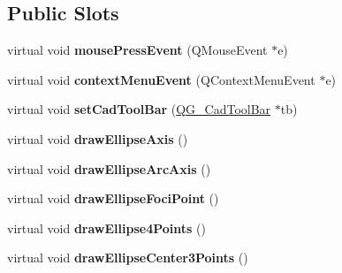 \subsection*{Public Slots}
\begin{DoxyCompactItemize}
\item 
\hypertarget{classQG__CadToolBarEllipses_aefb17f181cb3f1577c521fddf9ce9aeb}{virtual void {\bfseries mouse\-Press\-Event} (Q\-Mouse\-Event $\ast$e)}\label{classQG__CadToolBarEllipses_aefb17f181cb3f1577c521fddf9ce9aeb}

\item 
\hypertarget{classQG__CadToolBarEllipses_ad0e59b807b9b0c251b7962d2c3dcbccd}{virtual void {\bfseries context\-Menu\-Event} (Q\-Context\-Menu\-Event $\ast$e)}\label{classQG__CadToolBarEllipses_ad0e59b807b9b0c251b7962d2c3dcbccd}

\item 
\hypertarget{classQG__CadToolBarEllipses_a1c755426c34469f959b4b71fb3ef77b4}{virtual void {\bfseries set\-Cad\-Tool\-Bar} (\hyperlink{classQG__CadToolBar}{Q\-G\-\_\-\-Cad\-Tool\-Bar} $\ast$tb)}\label{classQG__CadToolBarEllipses_a1c755426c34469f959b4b71fb3ef77b4}

\item 
\hypertarget{classQG__CadToolBarEllipses_a366352b70bdd9b97a832e2b4c05e6328}{virtual void {\bfseries draw\-Ellipse\-Axis} ()}\label{classQG__CadToolBarEllipses_a366352b70bdd9b97a832e2b4c05e6328}

\item 
\hypertarget{classQG__CadToolBarEllipses_a41c7f083f56bcf4b83f97bf8c2c3b7d7}{virtual void {\bfseries draw\-Ellipse\-Arc\-Axis} ()}\label{classQG__CadToolBarEllipses_a41c7f083f56bcf4b83f97bf8c2c3b7d7}

\item 
\hypertarget{classQG__CadToolBarEllipses_a771a0149b6c2f7b943d02069bf4b93ed}{virtual void {\bfseries draw\-Ellipse\-Foci\-Point} ()}\label{classQG__CadToolBarEllipses_a771a0149b6c2f7b943d02069bf4b93ed}

\item 
\hypertarget{classQG__CadToolBarEllipses_a5955779ea145ac256da278544bd968a5}{virtual void {\bfseries draw\-Ellipse4\-Points} ()}\label{classQG__CadToolBarEllipses_a5955779ea145ac256da278544bd968a5}

\item 
\hypertarget{classQG__CadToolBarEllipses_a74c4cc606d7b79b40d67133e39c74b91}{virtual void {\bfseries draw\-Ellipse\-Center3\-Points} ()}\label{classQG__CadToolBarEllipses_a74c4cc606d7b79b40d67133e39c74b91}


\end{DoxyCompactItemize}
